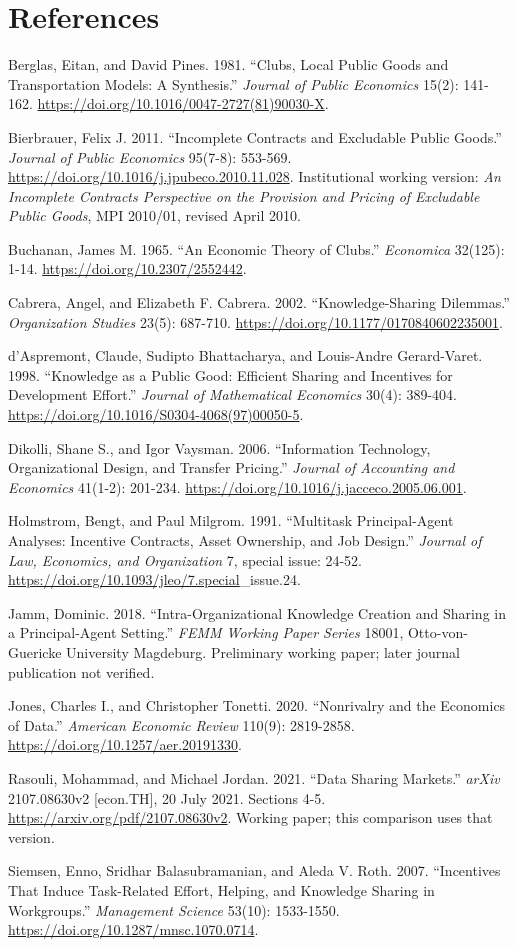 \documentclass[
  11pt,
]{article}
\begin{document}
{
\small
\setlength{\parindent}{0pt}
\section*{References}\label{references}

Berglas, Eitan, and David Pines. 1981. ``Clubs, Local Public Goods and
Transportation Models: A Synthesis.'' \emph{Journal of Public Economics}
15(2): 141-162. \url{https://doi.org/10.1016/0047-2727(81)90030-X}.

Bierbrauer, Felix J. 2011. ``Incomplete Contracts and Excludable Public
Goods.'' \emph{Journal of Public Economics} 95(7-8): 553-569.
\url{https://doi.org/10.1016/j.jpubeco.2010.11.028}. Institutional working
version: \emph{An Incomplete Contracts Perspective on the Provision and
Pricing of Excludable Public Goods}, MPI 2010/01, revised April 2010.

Buchanan, James M. 1965. ``An Economic Theory of Clubs.''
\emph{Economica} 32(125): 1-14. \url{https://doi.org/10.2307/2552442}.

Cabrera, Angel, and Elizabeth F. Cabrera. 2002. ``Knowledge-Sharing
Dilemmas.'' \emph{Organization Studies} 23(5): 687-710.
\url{https://doi.org/10.1177/0170840602235001}.

d'Aspremont, Claude, Sudipto Bhattacharya, and Louis-Andre Gerard-Varet.
1998. ``Knowledge as a Public Good: Efficient Sharing and Incentives for
Development Effort.'' \emph{Journal of Mathematical Economics} 30(4):
389-404. \url{https://doi.org/10.1016/S0304-4068(97)00050-5}.

Dikolli, Shane S., and Igor Vaysman. 2006. ``Information Technology,
Organizational Design, and Transfer Pricing.'' \emph{Journal of
Accounting and Economics} 41(1-2): 201-234.
\url{https://doi.org/10.1016/j.jacceco.2005.06.001}.

Holmstrom, Bengt, and Paul Milgrom. 1991. ``Multitask Principal-Agent
Analyses: Incentive Contracts, Asset Ownership, and Job Design.''
\emph{Journal of Law, Economics, and Organization} 7, special issue:
24-52. \url{https://doi.org/10.1093/jleo/7.special}\_issue.24.

Jamm, Dominic. 2018. ``Intra-Organizational Knowledge Creation and
Sharing in a Principal-Agent Setting.'' \emph{FEMM Working Paper Series}
18001, Otto-von-Guericke University Magdeburg. Preliminary working
paper; later journal publication not verified.

Jones, Charles I., and Christopher Tonetti. 2020. ``Nonrivalry and the
Economics of Data.'' \emph{American Economic Review} 110(9): 2819-2858.
\url{https://doi.org/10.1257/aer.20191330}.

Rasouli, Mohammad, and Michael Jordan. 2021. ``Data Sharing Markets.''
\emph{arXiv} 2107.08630v2 {[}econ.TH{]}, 20 July 2021. Sections 4-5.
\url{https://arxiv.org/pdf/2107.08630v2}. Working paper; this comparison uses
that version.

Siemsen, Enno, Sridhar Balasubramanian, and Aleda V. Roth. 2007.
``Incentives That Induce Task-Related Effort, Helping, and Knowledge
Sharing in Workgroups.'' \emph{Management Science} 53(10): 1533-1550.
\url{https://doi.org/10.1287/mnsc.1070.0714}.

}
\clearpage
\end{document}
